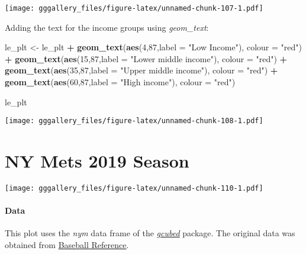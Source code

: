 \documentclass[]{book}
\newenvironment{Shaded}{\begin{snugshade}}{\end{snugshade}}
\newcommand{\DataTypeTok}[1]{\textcolor[rgb]{0.13,0.29,0.53}{#1}}
\newcommand{\DecValTok}[1]{\textcolor[rgb]{0.00,0.00,0.81}{#1}}
\newcommand{\KeywordTok}[1]{\textcolor[rgb]{0.13,0.29,0.53}{\textbf{#1}}}
\newcommand{\NormalTok}[1]{#1}
\newcommand{\OperatorTok}[1]{\textcolor[rgb]{0.81,0.36,0.00}{\textbf{#1}}}
\newcommand{\StringTok}[1]{\textcolor[rgb]{0.31,0.60,0.02}{#1}}
\begin{document}
\texttt{[image: gggallery\_files/figure-latex/unnamed-chunk-107-1.pdf]}

Adding the text for the income groups using \emph{geom\_text}:

\begin{Shaded}
\begin{Highlighting}[]
\NormalTok{le_plt <-}\StringTok{ }\NormalTok{le_plt }\OperatorTok{+}\StringTok{ }
\StringTok{  }\KeywordTok{geom_text}\NormalTok{(}\KeywordTok{aes}\NormalTok{(}\DecValTok{4}\NormalTok{,}\DecValTok{87}\NormalTok{,}\DataTypeTok{label =} \StringTok{"Low Income"}\NormalTok{), }\DataTypeTok{colour =} \StringTok{"red"}\NormalTok{) }\OperatorTok{+}
\StringTok{  }\KeywordTok{geom_text}\NormalTok{(}\KeywordTok{aes}\NormalTok{(}\DecValTok{15}\NormalTok{,}\DecValTok{87}\NormalTok{,}\DataTypeTok{label =} \StringTok{"Lower middle income"}\NormalTok{), }\DataTypeTok{colour =} \StringTok{"red"}\NormalTok{) }\OperatorTok{+}
\StringTok{  }\KeywordTok{geom_text}\NormalTok{(}\KeywordTok{aes}\NormalTok{(}\DecValTok{35}\NormalTok{,}\DecValTok{87}\NormalTok{,}\DataTypeTok{label =} \StringTok{"Upper middle income"}\NormalTok{), }\DataTypeTok{colour =} \StringTok{"red"}\NormalTok{) }\OperatorTok{+}
\StringTok{  }\KeywordTok{geom_text}\NormalTok{(}\KeywordTok{aes}\NormalTok{(}\DecValTok{60}\NormalTok{,}\DecValTok{87}\NormalTok{,}\DataTypeTok{label =} \StringTok{"High income"}\NormalTok{), }\DataTypeTok{colour =} \StringTok{"red"}\NormalTok{)}

\NormalTok{le_plt }
\end{Highlighting}
\end{Shaded}

\texttt{[image: gggallery\_files/figure-latex/unnamed-chunk-108-1.pdf]}

\hypertarget{metsbar}{%
\chapter*{NY Mets 2019 Season}\label{metsbar}}

\texttt{[image: gggallery\_files/figure-latex/unnamed-chunk-110-1.pdf]}

\hypertarget{metsbardata}{%
\subsubsection*{Data}\label{metsbardata}}

This plot uses the \emph{nym} data frame of the \protect\hyperlink{gcubed}{\emph{gcubed}} package. The original data was obtained from
\href{https://www.baseball-reference.com/teams/NYM/2019.shtml}{Baseball Reference}.
\end{document}
